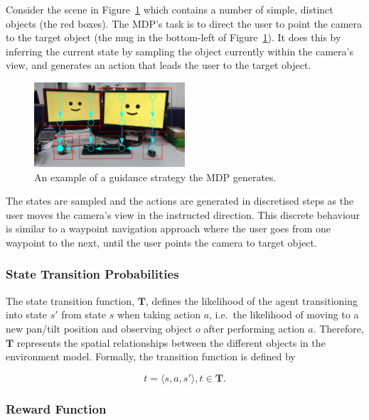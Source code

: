 \documentclass[a4paper, twoside]{article}
\begin{document}
Consider the scene in Figure~\ref{fig:route-example} which contains a number of simple, distinct objects (the red boxes). The MDP's task is to direct the user to point the camera to the target object (the mug in the bottom-left of Figure~\ref{fig:route-example}). It does this by inferring the current state by sampling the object currently within the camera's view, and generates an action that leads the user to the target object. 

\begin{figure}
  \centering
  \includegraphics[width=0.5\textwidth]{figures/office_desk_example.png}
  \caption{An example of a guidance strategy the MDP generates. }\label{fig:route-example}
\end{figure}

The states are sampled and the actions are generated in discretised steps as the user moves the camera's view in the instructed direction. This discrete behaviour is similar to a waypoint navigation approach where the user goes from one waypoint to the next, until the user points the camera to target object. 

\subsubsection{State Transition Probabilities}

\noindent The state transition function, $\mathbf{T}$, defines the likelihood of the agent transitioning into state $s'$ from state $s$ when taking action $a$, i.e.\ the likelihood of moving to a new pan/tilt position and observing object $o$ after performing action $a$. Therefore, $\mathbf{T}$ represents the spatial relationships between the different objects in the environment model. Formally, the transition function is defined by

\begin{equation}
  t=\langle{}s, a, s'\rangle, t\in{}\mathbf{T}.
\end{equation}

\subsubsection{Reward Function}
\end{document}
